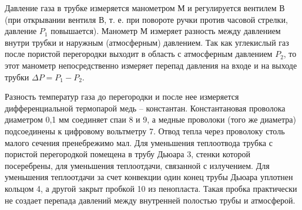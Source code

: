 \documentclass[12pt,a4paper]{article}
\begin{document}
Давление газа в трубке измеряется манометром М и регулируется вентилем В (при открывании вентиля В, т. е. при повороте ручки против часовой стрелки, давление $ P_1 $ повышается). Манометр М измеряет разность между давлением внутри трубки и наружным (атмосферным) давлением. Так как углекислый газ после пористой перегородки выходит в область с атмосферным давлением $ P_2 $, то этот манометр непосредственно измеряет перепад давления на входе и на выходе трубки $ \Delta P = P_1 - P_2 $.

Разность температур газа до перегородки и после нее измеряется дифференциальной термопарой медь -- константан. Константановая проволока диаметром 0,1 мм соединяет спаи 8 и 9, а медные проволоки (того же диаметра) подсоединены к цифровому вольтметру 7. Отвод тепла через проволоку столь малого сечения пренебрежимо мал. Для уменьшения теплоотвода трубка с пористой перегородкой помещена в трубу Дьюара 3, стенки которой посеребрены, для уменьшения теплоотдачи, связанной с излучением. Для уменьшения теплоотдачи за счет конвекции один конец трубы Дьюара уплотнен кольцом 4, а другой закрыт пробкой 10 из пенопласта. Такая пробка практически не создает перепада давлений между внутренней полостью трубы и атмосферой.
\end{document}
